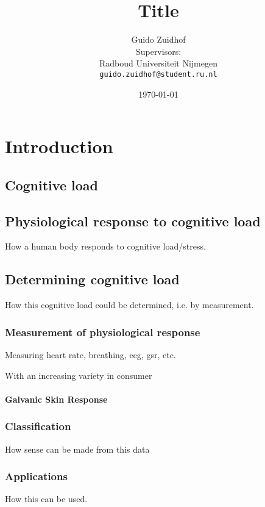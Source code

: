 \documentclass[12pt,fleqn,leqno,letterpaper]{article}
\title{Title}
\author{Guido Zuidhof\\
  \small{ Supervisors:  }\\
  \small{Radboud Universiteit Nijmegen}\\
  \small{\texttt{guido.zuidhof@student.ru.nl}}
}
\date{\today}
\begin{document}
\maketitle



\begin{abstract}
\end{abstract}

\section{Introduction}
\subsection{Cognitive load}

\subsection{Physiological response to cognitive load}
How a human body responds to cognitive load/stress. 

\subsection{Determining cognitive load}
How this cognitive load could be determined, i.e. by measurement.

\subsubsection{Measurement of physiological response}
Measuring heart rate, breathing, eeg, gsr, etc.

With an increasing variety in consumer 

\paragraph{Galvanic Skin Response}


\subsubsection{Classification}
How sense can be made from this data

\subsubsection{Applications}
How this can be used.
\end{document}
